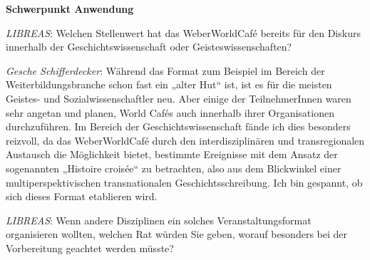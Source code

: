 \documentclass[a4paper,
fontsize=11pt,
oneside,
numbers=noperiodatend,
parskip=half-,
bibliography=totoc,
final
]{scrartcl}
\begin{document}
\textbf{Schwerpunkt Anwendung}

\emph{LIBREAS}: Welchen Stellenwert hat das WeberWorldCafé bereits für
den Diskurs innerhalb der Geschichtswissenschaft oder
Geisteswissenschaften?

\emph{Gesche Schifferdecker}: Während das Format zum Beispiel im Bereich
der Weiterbildungsbranche schon fast ein „alter Hut`` ist, ist es für
die meisten Geistes- und Sozialwissenschaftler neu. Aber einige der
TeilnehmerInnen waren sehr angetan und planen, World Cafés auch
innerhalb ihrer Organisationen durchzuführen. Im Bereich der
Geschichtswissenschaft fände ich dies besonders reizvoll, da das
WeberWorldCafé durch den interdisziplinären und transregionalen
Austausch die Möglichkeit bietet, bestimmte Ereignisse mit dem Ansatz
der sogenannten „Histoire croisée`` zu betrachten, also aus dem
Blickwinkel einer multiperspektivischen transnationalen
Geschichtsschreibung. Ich bin gespannt, ob sich dieses Format etablieren
wird.

\emph{LIBREAS}: Wenn andere Disziplinen ein solches Veranstaltungsformat
organisieren wollten, welchen Rat würden Sie geben, worauf besonders bei
der Vorbereitung geachtet werden müsste?
\end{document}
